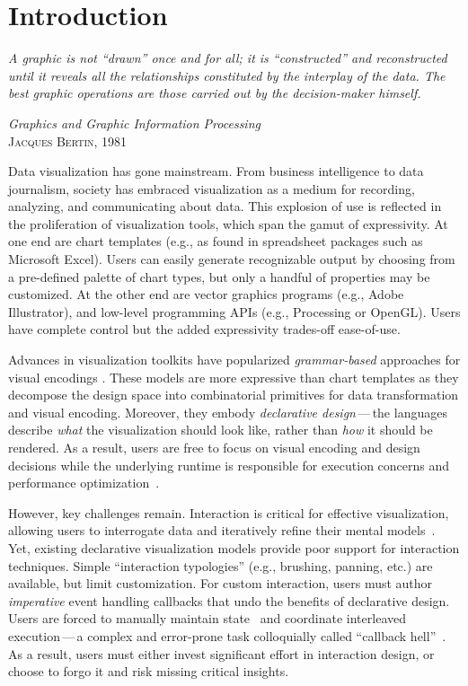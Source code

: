 \chapter{Introduction}

\vspace{-35pt}

\setlength{}
\epigraph{\textit{A graphic is not ``drawn'' once and for all; it is
``constructed'' and reconstructed until it reveals all the relationships
 constituted by the interplay of the data. The best graphic operations are those
 carried out by the decision-maker himself.}} {\textit{Graphics and Graphic
 Information Processing}\\\textsc{Jacques Bertin, 1981}}

Data visualization has gone mainstream. From business intelligence to data
journalism, society has embraced visualization as a medium for recording,
analyzing, and communicating about data. This explosion of use is reflected in
the proliferation of visualization tools, which span the gamut of expressivity.
At one end are chart templates (e.g., as found in spreadsheet packages such as
Microsoft Excel). Users can easily generate recognizable output by choosing from
a pre-defined palette of chart types, but only a handful of properties may be
customized. At the other end are vector graphics programs (e.g., Adobe
Illustrator), and low-level programming APIs (e.g., Processing or OpenGL). Users
have complete control but the added expressivity trades-off ease-of-use.

Advances in visualization toolkits have popularized \emph{grammar-based}
approaches for visual encodings
\cite{wilkinson:grammar,stolte:polaris,wickham:layered,bostock:protovis,bostock:d3}.
These models are more expressive than chart templates as they decompose the
design space into combinatorial primitives for data transformation and visual
encoding. Moreover, they embody \emph{declarative design}\,---\,the languages
describe \emph{what} the visualization should look like, rather than \emph{how}
it should be rendered. As a result, users are free to focus on visual encoding
and design decisions while the underlying runtime is responsible for execution
concerns and performance optimization~\cite{heer:protovisjava}.

However, key challenges remain. Interaction is critical for effective
visualization, allowing users to interrogate data and iteratively refine their
mental models~\cite{pike:interactionscience,yi:understanding}. Yet, existing
declarative visualization models provide poor support for interaction
techniques. Simple ``interaction typologies'' (e.g., brushing, panning, etc.)
are available, but limit customization. For custom interaction, users must
author \emph{imperative} event handling callbacks that undo the benefits of
declarative design. Users are forced to manually maintain
state~\cite{cooper:embedding} and coordinate interleaved execution\,---\,a
complex and error-prone task colloquially called ``callback
hell''~\cite{edwards:coherent}. As a result, users must either invest
significant effort in interaction design, or choose to forgo it and risk missing
critical insights.

